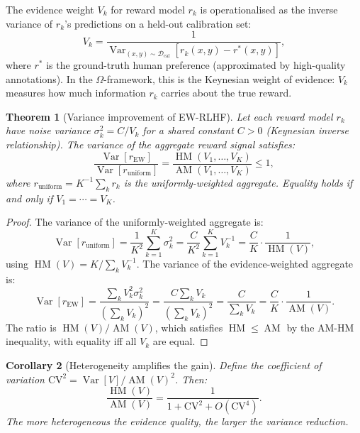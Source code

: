 \documentclass[11pt,a4paper]{article}
\newtheorem{theorem}{Theorem}[section]
\newtheorem{corollary}[theorem]{Corollary}
\DeclareMathOperator{\AM}{AM}
\DeclareMathOperator{\HM}{HM}
\DeclareMathOperator{\Var}{Var}
\newcommand{\cD}{\mathcal{D}}
\begin{document}
The evidence weight $V_k$ for reward model $r_k$ is operationalised as the inverse variance of $r_k$'s predictions on a held-out calibration set:
\begin{equation}
\label{eq:evidence-operational}
    V_k = \frac{1}{\Var_{(x,y) \sim \cD_{\mathrm{cal}}}[r_k(x,y) - r^*(x,y)]},
\end{equation}
where $r^*$ is the ground-truth human preference (approximated by high-quality annotations). In the $\Omega$-framework, this is the Keynesian weight of evidence: $V_k$ measures how much information $r_k$ carries about the true reward.

\begin{theorem}[Variance improvement of EW-RLHF]
\label{thm:ew-variance}
Let each reward model $r_k$ have noise variance $\sigma_k^2 = C / V_k$ for a shared constant $C > 0$ (Keynesian inverse relationship). The variance of the aggregate reward signal satisfies:
\begin{equation}
\label{eq:variance-improvement}
    \frac{\Var[r_{\mathrm{EW}}]}{\Var[r_{\mathrm{uniform}}]} = \frac{\HM(V_1, \ldots, V_K)}{\AM(V_1, \ldots, V_K)} \leq 1,
\end{equation}
where $r_{\mathrm{uniform}} = K^{-1} \sum_k r_k$ is the uniformly-weighted aggregate. Equality holds if and only if $V_1 = \cdots = V_K$.
\end{theorem}

\begin{proof}
The variance of the uniformly-weighted aggregate is:
\[
    \Var[r_{\mathrm{uniform}}] = \frac{1}{K^2} \sum_{k=1}^K \sigma_k^2 = \frac{C}{K^2} \sum_{k=1}^K V_k^{-1} = \frac{C}{K} \cdot \frac{1}{\HM(V)},
\]
using $\HM(V) = K / \sum_k V_k^{-1}$. The variance of the evidence-weighted aggregate is:
\[
    \Var[r_{\mathrm{EW}}] = \frac{\sum_k V_k^2 \sigma_k^2}{(\sum_k V_k)^2} = \frac{C \sum_k V_k}{(\sum_k V_k)^2} = \frac{C}{\sum_k V_k} = \frac{C}{K} \cdot \frac{1}{\AM(V)}.
\]
The ratio is $\HM(V)/\AM(V)$, which satisfies $\HM \leq \AM$ by the AM-HM inequality, with equality iff all $V_k$ are equal.
\end{proof}

\begin{corollary}[Heterogeneity amplifies the gain]
\label{cor:heterogeneity}
Define the coefficient of variation $\mathrm{CV}^2 = \Var[V] / \AM(V)^2$. Then:
\begin{equation}
    \frac{\HM(V)}{\AM(V)} = \frac{1}{1 + \mathrm{CV}^2 + O(\mathrm{CV}^4)}.
\end{equation}
The more heterogeneous the evidence quality, the larger the variance reduction.
\end{corollary}
\end{document}

